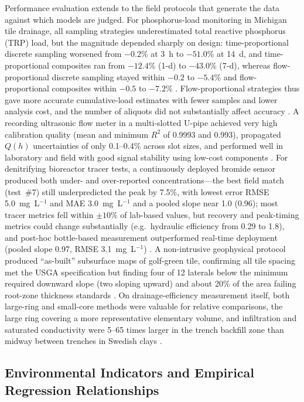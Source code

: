 \documentclass[11pt]{article}
\begin{document}
Performance evaluation extends to the field protocols that generate the data
against which models are judged. For phosphorus-load monitoring in Michigan tile
drainage, all sampling strategies underestimated total reactive phosphorus (TRP)
load, but the magnitude depended sharply on design: time-proportional discrete
sampling worsened from $-0.2$\% at 3~h to $-51.0$\% at 14~d, and time-proportional
composites ran from $-12.4$\% (1-d) to $-43.0$\% (7-d), whereas flow-proportional
discrete sampling stayed within $-0.2$ to $-5.4$\% and flow-proportional
composites within $-0.5$ to $-7.2$\% \parencite{Dialameh2022}. Flow-proportional
strategies thus gave more accurate cumulative-load estimates with fewer samples
and lower analysis cost, and the number of aliquots did not substantially affect
accuracy \parencite{Dialameh2022}. A recording ultrasonic flow meter in a
multi-slotted U-pipe achieved very high calibration quality (mean and minimum
$R^2$ of 0.9993 and 0.993), propagated $Q(h)$ uncertainties of only 0.1--0.4\%
across slot sizes, and performed well in laboratory and field with good signal
stability using low-cost components \parencite{Enamorado2007}. For denitrifying
bioreactor tracer tests, a continuously deployed bromide sensor produced both
under- and over-reported concentrations---the best field match (test~\#7) still
underpredicted the peak by 7.5\%, with lowest error RMSE 5.0~mg~L$^{-1}$ and MAE
3.0~mg~L$^{-1}$ and a pooled slope near 1.0 (0.96); most tracer metrics fell
within $\pm10$\% of lab-based values, but recovery and peak-timing metrics could
change substantially (e.g.\ hydraulic efficiency from 0.29 to 1.8), and post-hoc
bottle-based measurement outperformed real-time deployment (pooled slope 0.97,
RMSE 3.1~mg~L$^{-1}$) \parencite{deOliveira2023b}. A non-intrusive geophysical
protocol produced ``as-built'' subsurface maps of golf-green tile, confirming
all tile spacing met the USGA specification but finding four of 12 laterals below
the minimum required downward slope (two sloping upward) and about 20\% of the
area failing root-zone thickness standards \parencite{Freeland2014}. On
drainage-efficiency measurement itself, both large-ring and small-core methods
were valuable for relative comparisons, the large ring covering a more
representative elementary volume, and infiltration and saturated conductivity
were 5--65 times larger in the trench backfill zone than midway between trenches
in Swedish clays \parencite{Messing2006}.

\subsection{Environmental Indicators and Empirical Regression Relationships}
\end{document}
